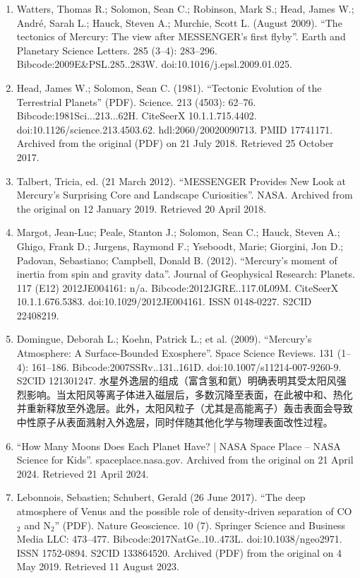 \begin{enumerate}
\item Watters, Thomas R.; Solomon, Sean C.; Robinson, Mark S.; Head, James W.; André, Sarah L.; Hauck, Steven A.; Murchie, Scott L. (August 2009). ``The tectonics of Mercury: The view after MESSENGER's first flyby''. Earth and Planetary Science Letters. 285 (3–4): 283–296. Bibcode:2009E\&PSL.285..283W. doi:10.1016/j.epsl.2009.01.025.
\item Head, James W.; Solomon, Sean C. (1981). ``Tectonic Evolution of the Terrestrial Planets'' (PDF). Science. 213 (4503): 62–76. Bibcode:1981Sci...213...62H. CiteSeerX 10.1.1.715.4402. doi:10.1126/science.213.4503.62. hdl:2060/20020090713. PMID 17741171. Archived from the original (PDF) on 21 July 2018. Retrieved 25 October 2017.
\item Talbert, Tricia, ed. (21 March 2012). ``MESSENGER Provides New Look at Mercury's Surprising Core and Landscape Curiosities''. NASA. Archived from the original on 12 January 2019. Retrieved 20 April 2018.
\item Margot, Jean-Luc; Peale, Stanton J.; Solomon, Sean C.; Hauck, Steven A.; Ghigo, Frank D.; Jurgens, Raymond F.; Yseboodt, Marie; Giorgini, Jon D.; Padovan, Sebastiano; Campbell, Donald B. (2012). ``Mercury's moment of inertia from spin and gravity data''. Journal of Geophysical Research: Planets. 117 (E12) 2012JE004161: n/a. Bibcode:2012JGRE..117.0L09M. CiteSeerX 10.1.1.676.5383. doi:10.1029/2012JE004161. ISSN 0148-0227. S2CID 22408219.
\item Domingue, Deborah L.; Koehn, Patrick L.; et al. (2009). ``Mercury's Atmosphere: A Surface-Bounded Exosphere''. Space Science Reviews. 131 (1–4): 161–186. Bibcode:2007SSRv..131..161D. doi:10.1007/s11214-007-9260-9. S2CID 121301247.  
水星外逸层的组成（富含氢和氦）明确表明其受太阳风强烈影响。当太阳风等离子体进入磁层后，多数沉降至表面，在此被中和、热化并重新释放至外逸层。此外，太阳风粒子（尤其是高能离子）轰击表面会导致中性原子从表面溅射入外逸层，同时伴随其他化学与物理表面改性过程。
\item ``How Many Moons Does Each Planet Have? | NASA Space Place – NASA Science for Kids''. spaceplace.nasa.gov. Archived from the original on 21 April 2024. Retrieved 21 April 2024.
\item Lebonnois, Sebastien; Schubert, Gerald (26 June 2017). ``The deep atmosphere of Venus and the possible role of density-driven separation of CO$_2$ and N$_2$'' (PDF). Nature Geoscience. 10 (7). Springer Science and Business Media LLC: 473–477. Bibcode:2017NatGe..10..473L. doi:10.1038/ngeo2971. ISSN 1752-0894. S2CID 133864520. Archived (PDF) from the original on 4 May 2019. Retrieved 11 August 2023.

\end{enumerate}
